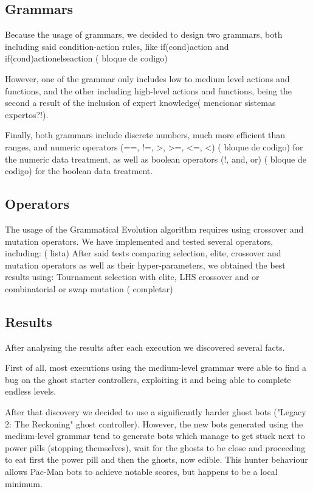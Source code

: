 \documentclass{llncs}
\newcommand{\paco}{Pac-Man }
\begin{document}
\subsection{Grammars}
Because the usage of grammars, we decided to design two grammars, both including said condition-action rules, like if(cond){action} and if(cond){action}else{action} ({\color{red} bloque de codigo})

However, one of the grammar only includes low to medium level actions and functions, and the other including high-level actions and functions, being the second a result of the inclusion of expert knowledge({\color{red} mencionar sistemas expertos?!}).

Finally, both grammars include discrete numbers, much more efficient than ranges, and numeric operators (==, !=, >, >=, <=, <) ({\color{red} bloque de codigo}) for the numeric data treatment, as well as boolean operators (!, and, or) ({\color{red} bloque de codigo}) for the boolean data treatment.

\subsection{Operators}
The usage of the Grammatical Evolution algorithm requires using crossover and mutation operators. We have implemented and tested several operators, including: ({\color{red} lista})
After said tests comparing selection, elite, crossover and mutation operators as well as their hyper-parameters, we obtained the best results using: Tournament selection with elite, LHS crossover and or combinatorial or swap mutation ({\color{red} completar})

\subsection{Results}
After analysing the results after each execution we discovered several facts. 

First of all, most executions using the medium-level grammar were able to find a bug on the ghost starter controllers, exploiting it and being able to complete endless levels.

After that discovery we decided to use a significantly harder ghost bots ("Legacy 2: The Reckoning" ghost controller). However, the new bots generated using the medium-level grammar tend to generate bots which manage to get stuck next to power pills (stopping themselves), wait for the ghosts to be close and proceeding to eat first the power pill and then the ghosts, now edible. This hunter behaviour allows \paco bots to achieve notable scores, but happens to be a local minimum.
\end{document}
